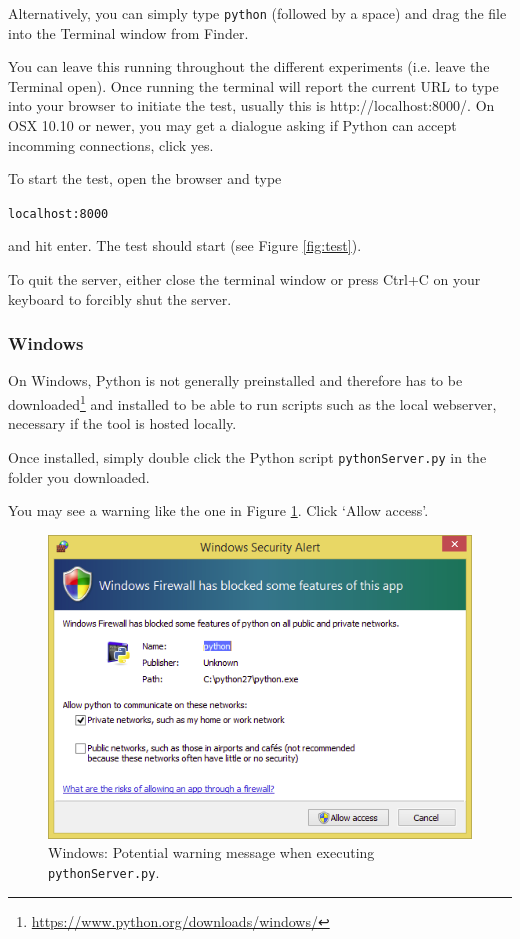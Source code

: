 \documentclass[11pt, oneside]{article}   	%
\begin{document}
	        Alternatively, you can simply type \texttt{python} (followed by a space) and drag the file into the Terminal window from Finder. %
			
			You can leave this running throughout the different experiments (i.e. leave the Terminal open). Once running the terminal will report the current URL to type into your browser to initiate the test, usually this is http://localhost:8000/.
			On OSX 10.10 or newer, you may get a dialogue asking if Python can accept incomming connections, click yes.

			To start the test, open the browser and type 
				
			\texttt{localhost:8000}

			and hit enter. The test should start (see Figure \ref{fig:test}). 

			To quit the server, either close the terminal window or press Ctrl+C on your keyboard to forcibly shut the server.

		\subsubsection{Windows}

			On Windows, Python is not generally preinstalled and therefore has to be downloaded\footnote{\url{https://www.python.org/downloads/windows/}} and installed to be able to run scripts such as the local webserver, necessary if the tool is hosted locally. 
		
			Once installed, simply double click the Python script \texttt{pythonServer.py} in the folder you downloaded.
			
			You may see a warning like the one in Figure \ref{fig:warning}. Click `Allow access'. 
			
			\begin{figure}[htbp]
            \begin{center}
            \includegraphics[width=.6\textwidth]{warning.png}
            \caption{Windows: Potential warning message when executing \texttt{pythonServer.py}.}
            \label{fig:warning}
            \end{center}
            \end{figure}
            
\end{document}
